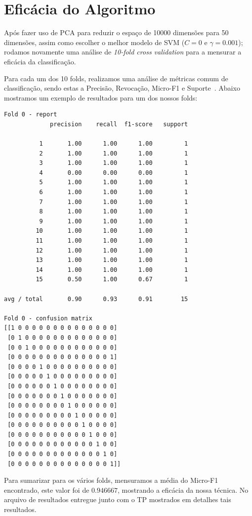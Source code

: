 \documentclass[brazil,a4paper,12pt]{article}
\begin{document}
\section{Eficácia do Algoritmo}


Após fazer uso de PCA para reduzir o espaço de 10000 dimensões para 50 
dimensões, assim como escolher o melhor modelo de SVM ($C=0$ e $\gamma=0.001$);
rodamos novamente uma análise de {\it 10-fold cross validation} para a mensurar
a eficácia da classificação.

Para cada um dos 10 folds, realizamos uma análise de métricas comum de classificação,
sendo estas a Precisão, Revocação, Micro-F1 e Suporte~\cite{meira}. Abaixo mostramos
um exemplo de resultados para um dos nossos folds:

\begin{verbatim}
Fold 0 - report
             precision    recall  f1-score   support

          1       1.00      1.00      1.00         1
          2       1.00      1.00      1.00         1
          3       1.00      1.00      1.00         1
          4       0.00      0.00      0.00         1
          5       1.00      1.00      1.00         1
          6       1.00      1.00      1.00         1
          7       1.00      1.00      1.00         1
          8       1.00      1.00      1.00         1
          9       1.00      1.00      1.00         1
         10       1.00      1.00      1.00         1
         11       1.00      1.00      1.00         1
         12       1.00      1.00      1.00         1
         13       1.00      1.00      1.00         1
         14       1.00      1.00      1.00         1
         15       0.50      1.00      0.67         1

avg / total       0.90      0.93      0.91        15

Fold 0 - confusion matrix
[[1 0 0 0 0 0 0 0 0 0 0 0 0 0 0]
 [0 1 0 0 0 0 0 0 0 0 0 0 0 0 0]
 [0 0 1 0 0 0 0 0 0 0 0 0 0 0 0]
 [0 0 0 0 0 0 0 0 0 0 0 0 0 0 1]
 [0 0 0 0 1 0 0 0 0 0 0 0 0 0 0]
 [0 0 0 0 0 1 0 0 0 0 0 0 0 0 0]
 [0 0 0 0 0 0 1 0 0 0 0 0 0 0 0]
 [0 0 0 0 0 0 0 1 0 0 0 0 0 0 0]
 [0 0 0 0 0 0 0 0 1 0 0 0 0 0 0]
 [0 0 0 0 0 0 0 0 0 1 0 0 0 0 0]
 [0 0 0 0 0 0 0 0 0 0 1 0 0 0 0]
 [0 0 0 0 0 0 0 0 0 0 0 1 0 0 0]
 [0 0 0 0 0 0 0 0 0 0 0 0 1 0 0]
 [0 0 0 0 0 0 0 0 0 0 0 0 0 1 0]
 [0 0 0 0 0 0 0 0 0 0 0 0 0 0 1]]
\end{verbatim}

Para sumarizar para os vários folds, mensuramos a média do Micro-F1 encontrado,
este valor foi de $0.946667$, mostrando a eficácia da nossa técnica. No arquivo
de resultados entregue junto com o TP mostrados em detalhes tais resultados.
\end{document}
